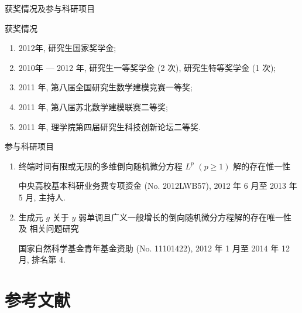 \documentclass[xcolor=svgnames,serif,table,10pt]{beamer}
\begin{document}
\begin{frame}[t]{获奖情况及参与科研项目}
\sffamily

\begin{block}{{\normalfont 获奖情况}}
  \begin{enumerate}\footnotesize
    \item 2012年, 研究生国家奖学金;
    \item 2010年 --- 2012 年, 研究生一等奖学金 (2 次), 研究生特等奖学金 (1 次);
    \item 2011 年, 第八届全国研究生数学建模竞赛一等奖;
    \item 2011 年, 第八届苏北数学建模联赛二等奖;
    \item 2011 年, 理学院第四届研究生科技创新论坛二等奖.
  \end{enumerate}
\end{block}
\pause
\begin{block}{{\normalfont 参与科研项目}}
  \begin{enumerate}\footnotesize
    \item 终端时间有限或无限的多维倒向随机微分方程 $L^p$ $(p\geq 1)$ 解的存在惟一性

          {\normalfont 中央高校基本科研业务费专项资金} (No. 2012LWB57), 2012 年 6 月至 2013 年 5 月, 主持人.
    \item 生成元 $g$ 关于 $y$ 弱单调且广义一般增长的倒向随机微分方程解的存在唯一性及
          相关问题研究

          {\normalfont 国家自然科学基金青年基金资助} (No. 11101422),
          2012 年 1 月至 2014 年 12 月, 排名第 4.
  \end{enumerate}
\end{block}
\end{frame}




\section*{参考文献}
\end{document}
